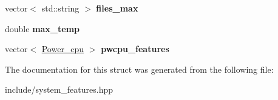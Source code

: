 \begin{DoxyCompactItemize}
\mbox{\label{structhw__conf_a7d657243e688a269edb3efb517e71a04}} 
vector$<$ std\+::string $>$ {\bfseries files\+\_\+max}
\item 
\mbox{\label{structhw__conf_a568256218f89000cbfbc2f9519f74e76}} 
double {\bfseries max\+\_\+temp}
\item 
\mbox{\label{structhw__conf_a6cc9b3e5210faaa0f4dcefedba9bf49a}} 
vector$<$ \mbox{\hyperlink{structpower__cpu}{Power\+\_\+cpu}} $>$ {\bfseries pwcpu\+\_\+features}
\end{DoxyCompactItemize}


The documentation for this struct was generated from the following file\+:\begin{DoxyCompactItemize}
\item 
include/system\+\_\+features.\+hpp\end{DoxyCompactItemize}
